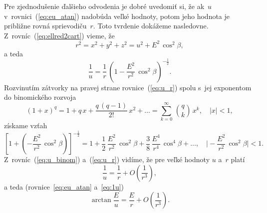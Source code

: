 \documentclass[a4paper, 12pt]{book}
\begin{document}
Pre zjednodušenie ďalšieho odvodenia je dobré uvedomiť si, že ak~$u$ 
v~rovnici~(\ref{eq:eu_atan}) nadobúda veľké hodnoty, potom jeho hodnota je 
približne rovná sprievodiču~$r$.  Toto tvrdenie dokážeme nasledovne.  
Z~rovníc~(\ref{eq:ellred2cart}) vieme, že
%
\begin{equation}
r^2 = x^2 + y^2 + z^2 = u^2 + E^2 \, \cos^2\beta{,}
\end{equation}
%
a teda
%
\begin{equation}
\label{eq:u_r}
\frac{1}{u} = \frac{1}{r} \, \left( 1 - \frac{E^2}{r^2} \, \cos^2\beta 
\right)^{-\frac{1}{2}}{.}
\end{equation}
%
Rozvinutím zátvorky na pravej strane rovnice~(\ref{eq:u_r}) spolu s~jej 
exponentom do binomického rozvoja \parencite[pozri napríklad][]{Gradshteyn2007}
%
\begin{equation}
(1 + x)^q = 1 + q \, x + \frac{q \, (q - 1)}{2!} \, x^2 + \dots = \sum_{k 
= 0}^{\infty} \, \binom{q}{k} \, x^k{,} \quad | x | < 1{,}
\end{equation}
%
získame vzťah
%
\begin{equation}
\label{eq:u_binom}
\left[ 1 + \left( - \frac{E^2}{r^2} \, \cos^2\beta \right) 
\right]^{-\frac{1}{2}} = 1 + \frac{1}{2} \, \frac{E^2}{r^2} \, \cos^2\beta 
+ \frac{3}{8} \, \frac{E^4}{r^4} \, \cos^4\beta + \dots{,} \quad \bigg\lvert 
-\frac{E^2}{r^2} \, \cos^2\beta \bigg\rvert < 1{.}
\end{equation}
%
Z~rovníc~(\ref{eq:u_binom}) a~(\ref{eq:u_r}) vidíme, že pre veľké hodnoty $u$ 
a~$r$ platí
%
\begin{equation}
\label{eq:1u}
\frac{1}{u} = \frac{1}{r} + O\left( \frac{1}{r^3} \right){,}
\end{equation}
%
a teda (rovnice~\ref{eq:eu_atan} a~\ref{eq:1u})
%
\begin{equation}
\label{eq:arctan_eu_r}
\arctan\frac{E}{u} = \frac{E}{r} + O\left( \frac{1}{r^3} \right){.}
\end{equation}
\end{document}
